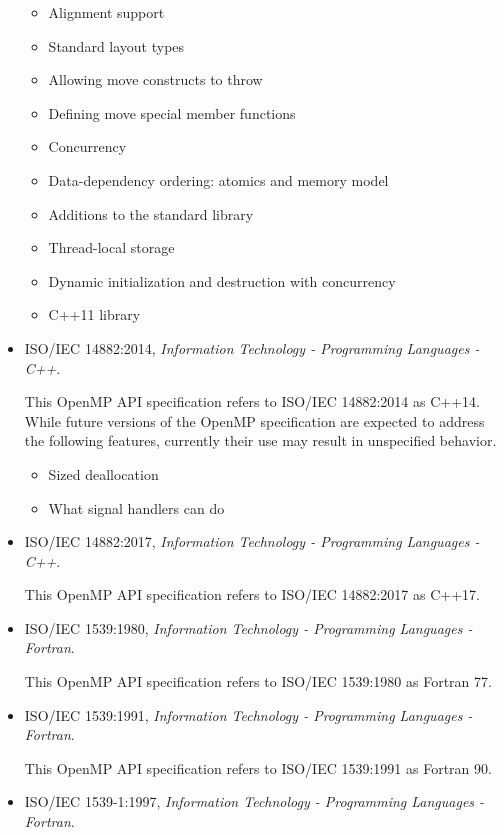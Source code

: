 \begin{itemize}
\begin{itemize}
\item Alignment support
\item Standard layout types
\item Allowing move constructs to throw
\item Defining move special member functions
\item Concurrency
\item Data-dependency ordering: atomics and memory model
\item Additions to the standard library
\item Thread-local storage
\item Dynamic initialization and destruction with concurrency
\item C++11 library
\end{itemize}

\item ISO/IEC 14882:2014, \textsl{Information Technology - Programming Languages - C++}.

This OpenMP API specification refers to ISO/IEC 14882:2014 as C++14. 
While future versions of the OpenMP specification are expected to
address the following features, currently their use may result in
unspecified behavior.

\begin{itemize}
\item Sized deallocation
\item What signal handlers can do
\end{itemize}

\item ISO/IEC 14882:2017, \textsl{Information Technology - Programming Languages - C++}.

This OpenMP API specification refers to ISO/IEC 14882:2017 as
C++17. 

\item ISO/IEC 1539:1980, \textsl{Information Technology - Programming Languages - Fortran}.

This OpenMP API specification refers to ISO/IEC 1539:1980 as Fortran 77.

\item ISO/IEC 1539:1991, \textsl{Information Technology - Programming Languages - Fortran}.

This OpenMP API specification refers to ISO/IEC 1539:1991 as Fortran 90.

\item ISO/IEC 1539-1:1997, \textsl{Information Technology - Programming Languages - Fortran}.


\end{itemize}
